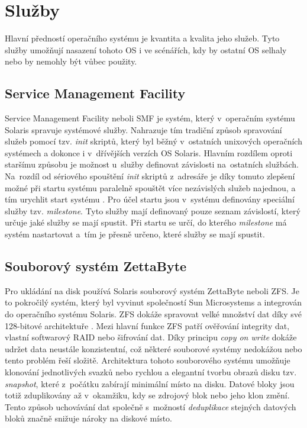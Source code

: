 \section{Služby}
\label{chapter:solaris:services}
Hlavní předností operačního systému je kvantita a kvalita jeho služeb. Tyto služby umožňují nasazení tohoto OS i ve scénářích,
kdy by ostatní OS selhaly nebo by nemohly být vůbec použity.  
\subsection{Service Management Facility}
\label{chapter:solaris:smf}
Service Management Facility neboli SMF je systém, který v~operačním systému Solaris spravuje systémové služby. Nahrazuje tím
tradiční způsob spravování služeb pomocí tzv. \textit{init} skriptů, který byl běžný v~ostatních unixových operačních systémech
a dokonce i v~dřívějších verzích OS Solaris. Hlavním rozdílem oproti staršímu způsobu je možnost u~služby definovat závislosti
na~ostatních službách. Na~rozdíl od sériového spouštění \textit{init} skriptů z~adresáře je díky tomuto zlepšení možné při startu
systému paralelně spouštět více nezávislých služeb najednou, a tím urychlit start systému \cite{cvut:biadu:sysstart}. Pro účel
startu jsou v~systému definovány speciální služby tzv. \textit{milestone}. Tyto služby mají definovaný
pouze seznam závislostí, který určuje jaké služby se mají spustit. Při startu se určí, do kterého \textit{milestone} má systém
nastartovat a~tím je přesně určeno, které služby se mají spustit.
\subsection{Souborový systém ZettaByte}
\label{chapter:solaris:zfs}
Pro ukládání na disk používá Solaris souborový systém ZettaByte neboli ZFS. Je to pokročilý systém, který byl vyvinut společností
Sun Microsystems a integrován do operačního systému Solaris. ZFS dokáže spravovat velké množství dat díky své 128-bitové 
architektuře \cite{cvut:thesis:mythesis}. Mezi hlavní funkce ZFS patří ověřování integrity dat, vlastní softwarový RAID nebo
šifrování dat. Díky principu \textit{copy on write} dokáže udržet data neustále konzistentní, což některé souborové systémy
nedokážou nebo tento problém řeší složitě. Architektura tohoto souborového systému umožňuje klonování jednotlivých svazků nebo
rychlou a elegantní tvorbu obrazů disku tzv. \textit{snapshot}, které z~počátku zabírají minimální místo na disku. Datové bloky
jsou totiž zduplikovány až v~okamžiku, kdy se zdrojový blok nebo jeho klon změní. Tento způsob uchovávání dat společně s~možností
\textit{deduplikace} stejných datových bloků značně snižuje nároky na diskové místo.

